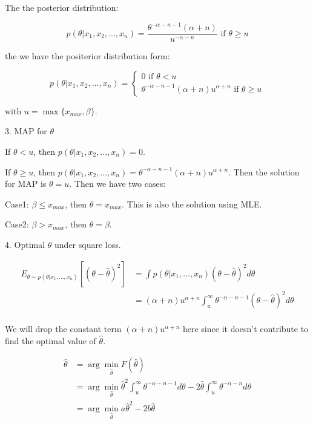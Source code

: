 \documentclass{article}
\begin{document}
The the posterior distribution:

$$
p(\theta|x_1,x_2,...,x_n) = \frac{\theta^{-\alpha-n-1}(\alpha+n)}{u^{-\alpha-n}} \text{ if }\theta\geq u
$$

the we have the positerior distribution form:

\begin{equation}
    p(\theta|x_1,x_2,...,x_n)=
    \begin{cases}
        0 \text{ if }\theta<u\\
        \theta^{-\alpha-n-1}(\alpha+n)u^{\alpha+n} \text{ if }\theta\geq u
    \end{cases}
\end{equation}

with $u=\max\{x_{max},\beta\}$.

3. MAP for $\theta$

If $\theta<u$, then $p(\theta|x_1,x_2,...,x_n)=0$.

If $\theta\geq u$, then $p(\theta|x_1,x_2,...,x_n)=\theta^{-\alpha-n-1}(\alpha+n)u^{\alpha+n}$.
Then the solution for MAP is $\theta=u$. Then we have two cases:

Case1: $\beta\leq x_{max}$, then $\theta=x_{max}$. This is also the solution using MLE.

Case2: $\beta>x_{max}$, then $\theta=\beta$.

4. Optimal $\theta$ under square loss.

$$
\begin{aligned}
    E_{\theta\sim p(\theta|x_1,...,x_n)}[(\theta-\hat{\theta})^2]&=\int p(\theta|x_1,...,x_n)(\theta-\hat{\theta})^2d\theta\\
    &=(\alpha+n)u^{\alpha+n}\int_{u}^{\infty}\theta^{-\alpha-n-1}(\theta-\hat{\theta})^2d\theta\\
\end{aligned}
$$

We will drop the constant term $(\alpha+n)u^{\alpha+n}$ here since it doesn't contribute to find
the optimal value of $\hat{\theta}$.

$$
\begin{aligned}
    \hat{\theta} &= \arg\min_{\hat{\theta}}F(\hat{\theta})\\
    &=\arg\min_{\hat{\theta}} \hat{\theta}^2\int_{u}^{\infty}\theta^{-\alpha-n-1}d\theta-2\hat{\theta}\int_{u}^{\infty}\theta^{-\alpha-n}d\theta\\
    &=\arg\min_{\hat{\theta}} a\hat{\theta}^2-2b\hat{\theta}
\end{aligned}
$$
\end{document}
